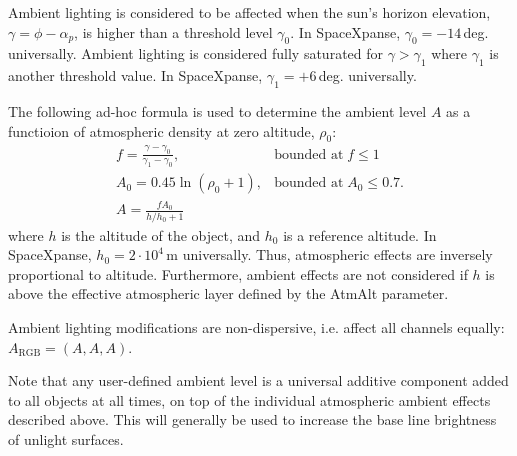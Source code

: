 \documentclass[a4paper]{article}
\begin{document}
Ambient lighting is considered to be affected when the sun's horizon elevation, $\gamma = \phi-\alpha_p$, is higher than a threshold level $\gamma_0$. In SpaceXpanse, $\gamma_0 = -14$\,deg. universally. Ambient lighting is considered fully saturated for $\gamma > \gamma_1$ where $\gamma_1$ is another threshold value. In SpaceXpanse, $\gamma_1 = +6$\,deg. universally.

The following ad-hoc formula is used to determine the ambient level $A$ as a functioion of atmospheric density at zero altitude, $\rho_0$:
\begin{equation}
\begin{array}{ll}
f = \frac{\gamma-\gamma_0}{\gamma_1-\gamma_0}, & \text{bounded at}\; f \leq 1\\
A_0 = 0.45 \ln(\rho_0+1), & \text{bounded at}\; A_0 \leq 0.7.\\
A = \frac{f A_0}{h/h_0 +1} &
\end{array}
\end{equation}
where $h$ is the altitude of the object, and $h_0$ is a reference altitude. In SpaceXpanse, $h_0 = 2\cdot10^4$\,m universally. Thus, atmospheric effects are inversely proportional to altitude. Furthermore, ambient effects are not considered if $h$ is above the effective atmospheric layer defined by the AtmAlt parameter.

Ambient lighting modifications are non-dispersive, i.e. affect all channels equally: $A_\text{RGB} = (A,A,A)$.

Note that any user-defined ambient level is a universal additive component added to all objects at all times, on top of the individual atmospheric ambient effects described above. This will generally be used to increase the base line brightness of unlight surfaces.
\end{document}
